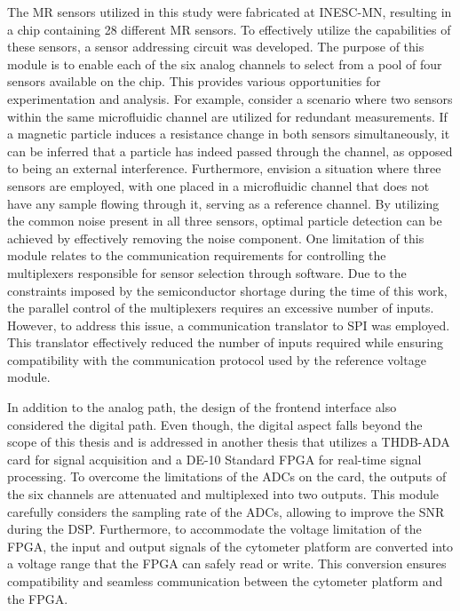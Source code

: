 The \ac{MR} sensors utilized in this study were fabricated at \ac{INESC-MN}, resulting in a chip containing 28 different \ac{MR} sensors. To effectively utilize the capabilities of these sensors, a sensor addressing circuit was developed. The purpose of this module is to enable each of the six analog channels to select from a pool of four sensors available on the chip. This provides various opportunities for experimentation and analysis. For example, consider a scenario where two sensors within the same microfluidic channel are utilized for redundant measurements. If a magnetic particle induces a resistance change in both sensors simultaneously, it can be inferred that a particle has indeed passed through the channel, as opposed to being an external interference. Furthermore, envision a situation where three sensors are employed, with one placed in a microfluidic channel that does not have any sample flowing through it, serving as a reference channel. By utilizing the common noise present in all three sensors, optimal particle detection can be achieved by effectively removing the noise component. One limitation of this module relates to the communication requirements for controlling the multiplexers responsible for sensor selection through software. Due to the constraints imposed by the semiconductor shortage during the time of this work, the parallel control of the multiplexers requires an excessive number of inputs. However, to address this issue, a communication translator to \ac{SPI} was employed. This translator effectively reduced the number of inputs required while ensuring compatibility with the communication protocol used by the reference voltage module. 

In addition to the analog path, the design of the frontend interface also considered the digital path. Even though, the digital aspect falls beyond the scope of this thesis and is addressed in another thesis that utilizes a THDB-ADA card for signal acquisition and a DE-10 Standard \ac{FPGA} for real-time signal processing. To overcome the limitations of the \ac{ADC}s on the card, the outputs of the six channels are attenuated and multiplexed into two outputs. This module carefully considers the sampling rate of the \ac{ADC}s, allowing to improve the \ac{SNR} during the \ac{DSP}. Furthermore, to accommodate the voltage limitation of the \ac{FPGA}, the input and output signals of the cytometer platform are converted into a voltage range that the \ac{FPGA} can safely read or write. This conversion ensures compatibility and seamless communication between the cytometer platform and the \ac{FPGA}.

